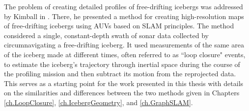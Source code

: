The problem of creating detailed profiles of free-drifting icebergs was addressed by Kimball in \cite{Kimball2011b}. There, he presented a method for creating high-resolution maps of free-drifting icebergs using AUVs based on SLAM principles. The method considered a single, constant-depth swath of sonar data collected by circumnavigating a free-drifting iceberg. It used measurements of the same area of the iceberg made at different times, often referred to as  ``loop closure" events, to estimate the iceberg's trajectory through inertial space during the course of the profiling mission and then subtract its motion from the reprojected data. This serves as a starting point for the work presented in this thesis with details on the similarities and differences between the two methods given in Chapters \ref{ch.LoopClosure}, \ref{ch.IcebergGeometry}, and \ref{ch.GraphSLAM}.




